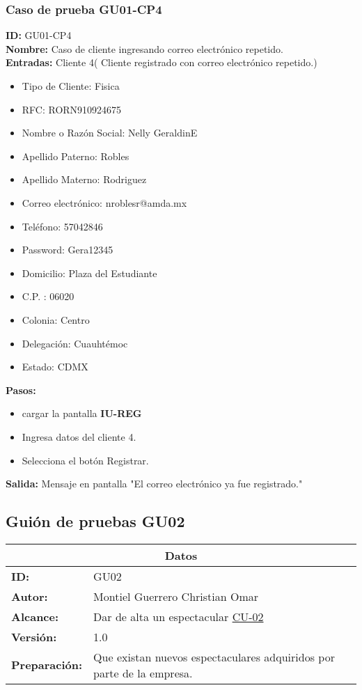 \subsubsection{Caso de prueba GU01-CP4}
\textbf{ID:} GU01-CP4\\
\textbf{Nombre:} Caso de cliente ingresando correo electrónico repetido.\\
\textbf{Entradas:}
Cliente 4( Cliente registrado con correo electrónico repetido.)
\begin{itemize}
    \item Tipo de Cliente: Fisica
    \item RFC: RORN910924675
    \item Nombre o Razón Social: Nelly GeraldinE
    \item Apellido Paterno: Robles
    \item Apellido Materno: Rodriguez
    \item Correo electrónico: nroblesr@amda.mx
    \item Teléfono: 57042846
    \item Password: Gera12345
    \item Domicilio: Plaza del Estudiante
    \item C.P. : 06020
    \item Colonia: Centro 
    \item Delegación: Cuauhtémoc
    \item Estado: CDMX
\end{itemize}
\textbf{Pasos:}
\begin{itemize}
\item cargar la pantalla \textbf{IU-REG}
    \item Ingresa datos del cliente 4.
    \item Selecciona el botón Registrar.
\end{itemize}
\textbf{Salida:}
Mensaje en pantalla "El correo electrónico ya fue registrado."
\clearpage

\subsection{Guión de pruebas GU02}
\begin{table}[htbp]
\centering
\begin{tabular}{| p{5cm}| p{13cm} |} \hline
\multicolumn{2}{|c|}{\textbf{Datos}} \\ \hline
\textbf{ID:}&GU02\\ \hline
\textbf{Autor:}&Montiel Guerrero Christian Omar\\ \hline
\textbf{Alcance:}&Dar de alta un espectacular \hyperlink{CU:CU02}{CU-02}\\ \hline
 \textbf {Versión:}&1.0 \\ \hline
\textbf{Preparación:}& Que existan nuevos espectaculares adquiridos por parte de la empresa.\\ \hline
\end{tabular}
\end{table}


